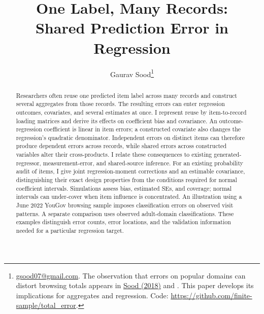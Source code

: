 \documentclass[11pt,letterpaper]{article}
\title{One Label, Many Records:\\Shared Prediction Error in Regression}
\author{Gaurav Sood\thanks{\href{mailto:gsood07@gmail.com}{gsood07@gmail.com}.
The observation that errors on popular domains can distort browsing totals
appears in \href{https://github.com/soodoku/gsood_com/blob/8f8269994a9c848ee182dd5dca9312b56dd4fb5d/wp_images/2018/09/ml_errors.pdf}{Sood (2018)} and
\citet{laohaprapanon2020domain}. This paper develops its implications for
aggregates and regression. Code:
\url{https://github.com/finite-sample/total_error}.}}
\date{}
\begin{document}
\maketitle

\begin{abstract}
Researchers often reuse one predicted item label across many records and
construct several aggregates from those records. The resulting errors can
enter regression outcomes, covariates, and several estimates at once. I
represent reuse by item-to-record loading matrices and derive its effects
on coefficient bias and covariance. An outcome-regression coefficient is
linear in item errors; a constructed covariate also changes the regression's
quadratic denominator. Independent errors on distinct items can therefore
produce dependent errors across records, while shared errors across constructed
variables alter their cross-products. I relate these consequences to existing
generated-regressor, measurement-error, and shared-source inference. For an
existing probability audit of items, I give joint regression-moment corrections
and an estimable covariance, distinguishing their exact design properties
from the conditions required for normal coefficient intervals. Simulations
assess bias, estimated SEs, and coverage; normal intervals can under-cover
when item influence is concentrated. An illustration using a June 2022
YouGov browsing sample imposes classification errors on observed visit
patterns. A separate comparison uses observed adult-domain classifications.
These examples distinguish error counts, error locations, and the validation
information needed for a particular regression target.
\end{abstract}

















\begingroup
\small
\setlength{\bibsep}{1pt}
\raggedright


\endgroup

\clearpage
\appendix
{}
\renewcommand{\thetable}{\thesection\arabic{table}}
\renewcommand{\thefigure}{\thesection\arabic{figure}}
\renewcommand{\theequation}{\thesection\arabic{equation}}
\end{document}
